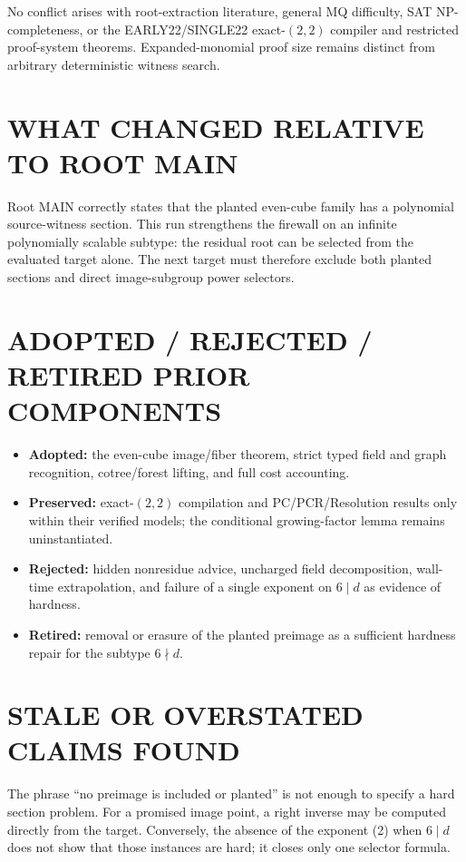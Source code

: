 \documentclass[11pt]{article}
\begin{document}
No conflict arises with root-extraction literature, general MQ difficulty,
SAT NP-completeness, or the EARLY22/SINGLE22 exact-$(2,2)$ compiler and
restricted proof-system theorems.  Expanded-monomial proof size remains
distinct from arbitrary deterministic witness search.

\section{WHAT CHANGED RELATIVE TO ROOT MAIN}
Root MAIN correctly states that the planted even-cube family has a polynomial
source-witness section.  This run strengthens the firewall on an infinite
polynomially scalable subtype: the residual root can be selected from the
evaluated target alone.  The next target must therefore exclude both planted
sections and direct image-subgroup power selectors.

\section{ADOPTED / REJECTED / RETIRED PRIOR COMPONENTS}
\begin{itemize}
\item \textbf{Adopted:} the even-cube image/fiber theorem, strict typed field
and graph recognition, cotree/forest lifting, and full cost accounting.
\item \textbf{Preserved:} exact-$(2,2)$ compilation and PC/PCR/Resolution
results only within their verified models; the conditional growing-factor
lemma remains uninstantiated.
\item \textbf{Rejected:} hidden nonresidue advice, uncharged field
decomposition, wall-time extrapolation, and failure of a single exponent on
$6\mid d$ as evidence of hardness.
\item \textbf{Retired:} removal or erasure of the planted preimage as a
sufficient hardness repair for the subtype $6\nmid d$.
\end{itemize}

\section{STALE OR OVERSTATED CLAIMS FOUND}
The phrase ``no preimage is included or planted'' is not enough to specify a
hard section problem.  For a promised image point, a right inverse may be
computed directly from the target.  Conversely, the absence of the exponent
(2) when $6\mid d$ does not show that those instances are hard; it closes only
one selector formula.
\end{document}
